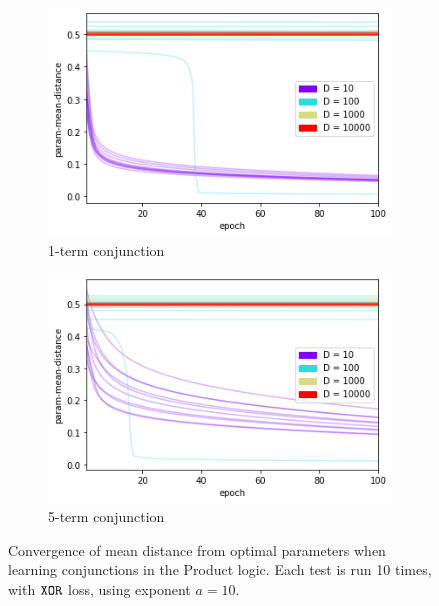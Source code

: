 \begin{figure}[h]
    \centering
    \begin{subfigure}[b]{0.48\textwidth}
        \centering
        \includegraphics[width=\textwidth]{imgs/conj-pmd-prod-nokeepn-1t.png}
        \caption{1-term conjunction}
        \label{fig:conjconvnokeepn1}
    \end{subfigure}
    \begin{subfigure}[b]{0.48\textwidth}
        \centering
        \includegraphics[width=\textwidth]{imgs/conj-pmd-prod-nokeepn-5t.png}
        \caption{5-term conjunction}
        \label{fig:conjconvnokeepn5}
    \end{subfigure}
       \caption{Convergence of mean distance from optimal parameters when learning conjunctions in the Product logic. Each test is run 10 times, with $\texttt{XOR}$ loss, using exponent $a=10$.}
       \label{fig:conjconvnokeepn}
\end{figure}

